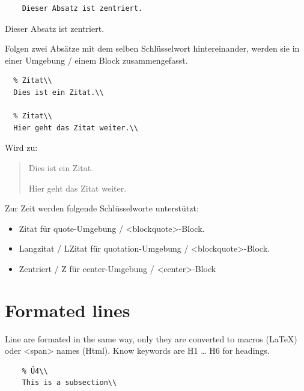 \documentclass{scrartcl}
\begin{document}
\begin{verbatim}
	Dieser Absatz ist zentriert.

\end{verbatim}

\begin{center}
Dieser Absatz ist zentriert.

\end{center}

Folgen zwei Absätze mit dem selben Schlüsselwort
hintereinander, werden sie in einer Umgebung / einem Block
zusammengefasst.

\begin{verbatim}
  % Zitat\\
  Dies ist ein Zitat.\\

  % Zitat\\
  Hier geht das Zitat weiter.\\

\end{verbatim}

Wird zu:

\begin{quote}
Dies ist ein Zitat.

Hier geht das Zitat weiter.

\end{quote}

Zur Zeit werden folgende Schlüsselworte unterstützt:

\begin{itemize}
\item Zitat für quote-Umgebung / <blockquote>-Block.
\item Langzitat / LZitat für quotation-Umgebung / <blockquote>-Block.
\item Zentriert / Z für center-Umgebung / <center>-Block

\end{itemize}

\section{Formated lines}

Line are formated in the same way, only they are converted
to macros (LaTeX) oder <span> names (Html). Know keywords
are H1 … H6 for headings.

\begin{verbatim}
    % Ü4\\
    This is a subsection\\

\end{verbatim}
\end{document}
